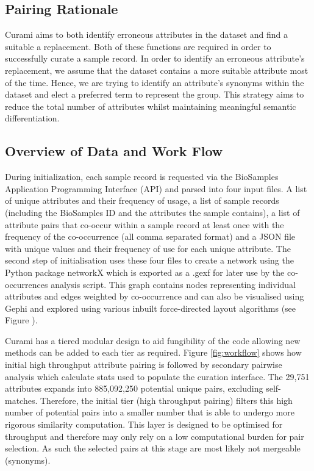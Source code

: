 \documentclass{bmcart}
\begin{document}
\subsection*{Pairing Rationale}

Curami aims to both identify erroneous attributes in the dataset and find a suitable a replacement. Both of these functions are required in order to successfully curate a sample record. In order to identify an erroneous attribute's replacement, we assume that the dataset contains a more suitable attribute most of the time. Hence, we are trying to identify an attribute's synonyms within the dataset and elect a preferred term to represent the group. This strategy aims to reduce the total number of attributes whilst maintaining meaningful semantic differentiation.

\subsection*{Overview of Data and Work Flow}

During initialization, each sample record is requested via the BioSamples Application Programming Interface (API) and parsed into four input files. A list of unique attributes and their frequency of usage, a list of sample records (including the BioSamples ID and the attributes the sample contains), a list of attribute pairs that co-occur within a sample record at least once with the frequency of the co-occurrence (all comma separated format) and a JSON file with unique values and their frequency of use for each unique attribute. The second step of initialisation uses these four files to create a network using the Python package networkX \cite{networkx} which is exported as a .gexf for later use by the co-occurrences analysis script. This graph contains nodes representing individual attributes and edges weighted by co-occurrence and can also be visualised using Gephi \cite{bastian2009gephi} and explored using various inbuilt force-directed layout algorithms \cite{jacomy2014forceatlas2} (see Figure \cite{fig:gephi}).

Curami has a tiered modular design to aid fungibility of the code allowing new methods can be added to each tier as required. Figure \ref{fig:workflow} shows how initial high throughput attribute pairing is followed by secondary pairwise analysis which calculate stats used to populate the curation interface. The 29,751 attributes expands into 885,092,250 potential unique pairs, excluding self-matches. Therefore, the initial tier (high throughput pairing) filters this high number of potential pairs into a smaller number that is able to undergo more rigorous similarity computation. This layer is designed to be optimised for throughput and therefore may only rely on a low computational burden for pair selection. As such the selected pairs at this stage are most likely not mergeable (synonyms).
\end{document}
